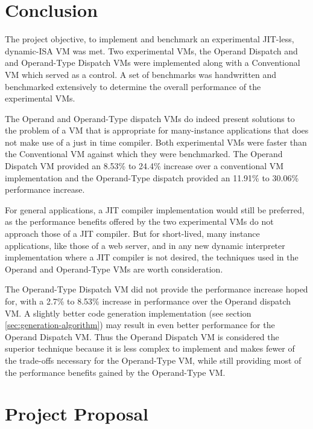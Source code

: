 \documentclass[english,a4paper,12pt]{report}
\begin{document}
\chapter{Conclusion}

The project objective, to implement and benchmark an experimental
JIT-less, dynamic-ISA VM was met. Two experimental VMs, the Operand
Dispatch and and Operand-Type Dispatch VMs were implemented along with
a Conventional VM which served as a control. A set of benchmarks was
handwritten and benchmarked extensively to determine the overall
performance of the experimental VMs.

The Operand and Operand-Type dispatch VMs do indeed present solutions
to the problem of a VM that is appropriate for many-instance
applications that does not make use of a just in time compiler. Both
experimental VMs were faster than the Conventional VM against which
they were benchmarked. The Operand Dispatch VM provided an 8.53\% to
24.4\% increase over a conventional VM implementation and the
Operand-Type dispatch provided an 11.91\% to 30.06\% performance
increase.

For general applications, a JIT compiler implementation would still be
preferred, as the performance benefits offered by the two experimental
VMs do not approach those of a JIT compiler. But for short-lived, many
instance applications, like those of a web server, and in any new
dynamic interpreter implementation where a JIT compiler is not
desired, the techniques used in the Operand and Operand-Type VMs are
worth consideration.

The Operand-Type Dispatch VM did not provide the performance increase
hoped for, with a 2.7\% to 8.53\% increase in performance over the
Operand dispatch VM. A slightly better code generation implementation
(see section \ref{sec:generation-algorithm}) may result in even better
performance for the Operand Dispatch VM. Thus the Operand Dispatch VM
is considered the superior technique because it is less complex to
implement and makes fewer of the trade-offs necessary for the
Operand-Type VM, while still providing most of the performance
benefits gained by the Operand-Type VM.

 


\newpage{}
\appendix
\chapter{Project Proposal} 
\end{document}
